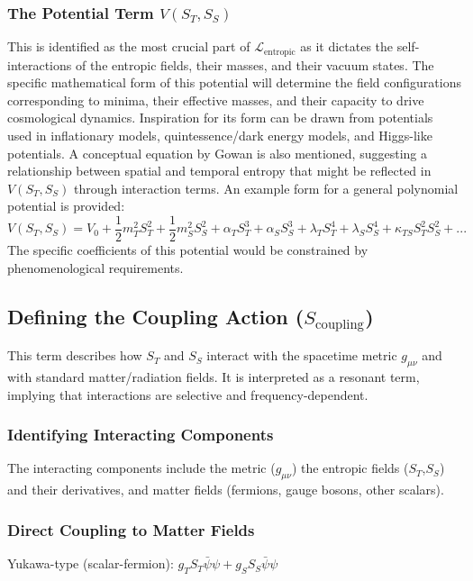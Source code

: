 \documentclass[11pt,a4paper]{article}
\newcommand{\ST}{S_T}
\newcommand{\SSp}{S_S}
\newcommand{\Scoupling}{S_{\text{coupling}}}
\begin{document}
\subsubsection{The Potential Term $V(\ST,\SSp)$}
\label{app:A.1.2}
This is identified as the most crucial part of $\mathcal{L}_{\text{entropic}}$ as it dictates the self-interactions of the entropic fields, their masses, and their vacuum states. The specific mathematical form of this potential will determine the field configurations corresponding to minima, their effective masses, and their capacity to drive cosmological dynamics. Inspiration for its form can be drawn from potentials used in inflationary models, quintessence/dark energy models, and Higgs-like potentials. A conceptual equation by Gowan is also mentioned, suggesting a relationship between spatial and temporal entropy that might be reflected in $V(\ST,\SSp)$ through interaction terms. An example form for a general polynomial potential is provided:
\begin{equation*}
V(\ST,\SSp)=V_0+\frac{1}{2}m_T^2\ST^2+\frac{1}{2}m_S^2\SSp^2+\alpha_T\ST^3+\alpha_S\SSp^3+\lambda_T\ST^4+\lambda_S\SSp^4+\kappa_{TS}\ST^2\SSp^2+...
\end{equation*}
The specific coefficients of this potential would be constrained by phenomenological requirements.

\subsection{Defining the Coupling Action ($\Scoupling$)}
\label{app:A.2}
This term describes how $\ST$ and $\SSp$ interact with the spacetime metric $g_{\mu\nu}$ and with standard matter/radiation fields. It is interpreted as a resonant term, implying that interactions are selective and frequency-dependent.

\subsubsection{Identifying Interacting Components}
The interacting components include the metric ($g_{\mu\nu}$) the entropic fields ($\ST$,$\SSp$) and their derivatives, and matter fields (fermions, gauge bosons, other scalars).

\subsubsection{Direct Coupling to Matter Fields}
Yukawa-type (scalar-fermion): $g_T\ST\bar{\psi}\psi+g_S\SSp\bar{\psi}\psi$
\end{document}
